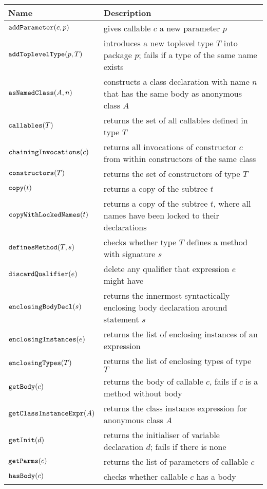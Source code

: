 \begin{center}
\label{fig:utility}
\begin{supertabular}{|l|p{10cm}|}
\hline
\textbf{Name} & \textbf{Description} \\ \hline\hline
$\text{\texttt{addParameter}}(c, p)$ & gives callable $c$ a new parameter $p$ \\
$\text{\texttt{addToplevelType}}(p, T)$ & introduces a new toplevel type $T$ into package $p$; fails if a type of the same name exists\\
$\text{\texttt{asNamedClass}}(A, n)$ & constructs a class declaration with name $n$ that has the same body as anonymous class $A$ \\
$\text{\texttt{callables}}(T)$ & returns the set of all callables defined in type $T$ \\
$\text{\texttt{chainingInvocations}}(c)$ & returns all invocations of constructor $c$ from within constructors of the same class\\
$\text{\texttt{constructors}}(T)$ & returns the set of constructors of type $T$ \\
$\text{\texttt{copy}}(t)$ & returns a copy of the subtree $t$ \\
$\text{\texttt{copyWithLockedNames}}(t)$ & returns a copy of the subtree $t$, where all names have been locked to their declarations \\
$\text{\texttt{definesMethod}}(T, s)$ & checks whether type $T$ defines a method with signature $s$ \\
$\text{\texttt{discardQualifier}}(e)$ & delete any qualifier that expression $e$ might have \\
$\text{\texttt{enclosingBodyDecl}}(s)$ & returns the innermost syntactically enclosing body declaration around statement $s$ \\
$\text{\texttt{enclosingInstances}}(e)$ & returns the list of enclosing instances of an expression \\
$\text{\texttt{enclosingTypes}}(T)$ & returns the list of enclosing types of type $T$ \\
$\text{\texttt{getBody}}(c)$ & returns the body of callable $c$, fails if $c$ is a method without body \\
$\text{\texttt{getClassInstanceExpr}}(A)$ & returns the class instance expression for anonymous class $A$ \\
$\text{\texttt{getInit}}(d)$ & returns the initialiser of variable declaration $d$; fails if there is none \\
$\text{\texttt{getParms}}(c)$ & returns the list of parameters of callable $c$ \\
$\text{\texttt{hasBody}}(c)$ & checks whether callable $c$ has a body \\

\end{supertabular}
\end{center}

